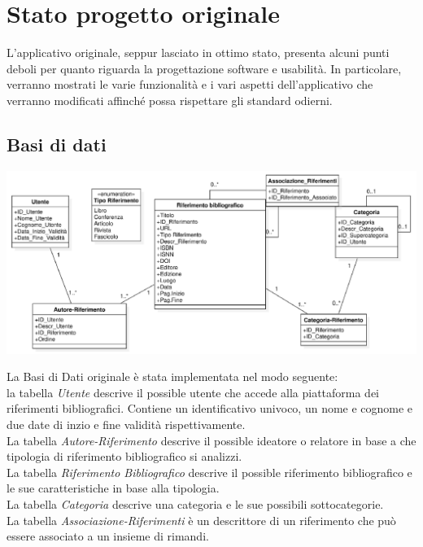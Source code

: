 \raggedright{\section{Stato progetto originale}}
L'applicativo originale, seppur lasciato in ottimo stato, presenta alcuni punti deboli per quanto riguarda la progettazione software e usabilità. In particolare, verranno mostrati le varie funzionalità e i vari aspetti dell'applicativo che verranno modificati affinché possa rispettare gli standard odierni.
\raggedright{{\subsection{Basi di dati}}}
         \begin{center}
     \hspace{-1cm}
            \includegraphics[width=.90\textwidth]{Immagini/VecchioProgetto/UML Basi di Dati pre ristrutturato.png} 
        \end{center}
La Basi di Dati originale è stata implementata nel modo seguente: \\la tabella \textit{Utente} descrive il possible utente che accede alla piattaforma dei riferimenti bibliografici. Contiene un identificativo univoco, un nome e cognome e due date di inzio e fine validità rispettivamente. \\
La tabella \textit{Autore-Riferimento} descrive il possible ideatore o relatore in base a che tipologia di riferimento bibliografico si analizzi. \\
La tabella \textit{Riferimento Bibliografico} descrive il possible riferimento bibliografico e le sue caratteristiche in base alla tipologia. \\
La tabella \textit{Categoria} descrive una categoria e le sue possibili sottocategorie. \\
La tabella \textit{Associazione-Riferimenti} è un descrittore di un riferimento che può essere associato a un insieme di rimandi. \\

